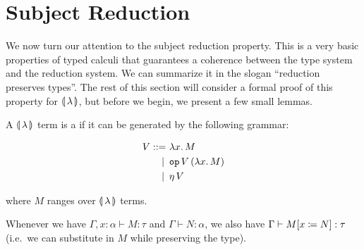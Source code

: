 \section{Subject Reduction}
\label{sec:subject-reduction}

We now turn our attention to the subject reduction property. This is a very
basic properties of typed calculi that guarantees a coherence between the
type system and the reduction system. We can summarize it in the slogan
``reduction preserves types''. The rest of this section will consider a
formal proof of this property for $\llparenthesis \, \lambda \, \rrparenthesis$, but before we begin,
we present a few small lemmas.

\begin{definition}
  A $\llparenthesis \, \lambda \, \rrparenthesis$ term is a  if it can be generated by
  the following grammar:

\begin{align*}
  V ::= &\ \lambda x.\, M \\
   | \, &\ \mathtt{op}\,V\,(\lambda x.\, M) \\
   | \, &\ \eta\,V
\end{align*}

  where $M$ ranges over $\llparenthesis \, \lambda \, \rrparenthesis$ terms.
\end{definition}

\begin{lemma}\label{lem:compositionality-types}
  

\end{lemma}

\begin{lemma}\label{lem:substitution-types}
  
  Whenever we have $\Gamma, x : \alpha \vdash M : \tau$ and
  $\Gamma \vdash N : \alpha$, we also have
  $\Gamma \vdash M[x \coloneqq N] : \tau$ (i.e.\ we can substitute in $M$
  while preserving the type).
\end{lemma}

